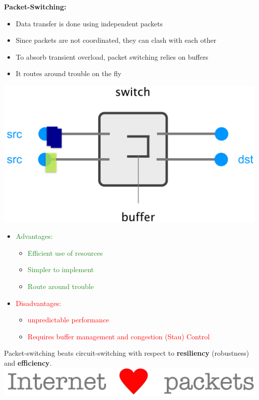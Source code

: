 \documentclass[a4paper, fontsize=8pt, landscape, DIV=1]{scrartcl}
\begin{document}
\begin{multicols*}{4}
				\textbf{Packet-Switching:}
				\vspace{-0.2cm}
				\begin{itemize}[noitemsep]
					\item Data transfer is done using independent packets 
					\item Since packets are not coordinated, they can clash with each other \
					\item To absorb transient overload, packet switching relies on buffers 
					\item It routes around trouble on the fly
				\end{itemize}
				\includegraphics[width=\columnwidth]{images/Overview/packet_switching_buffer.png}
				\begin{itemize}[noitemsep]
					\item \textcolor{ForestGreen}{Advantages:}
					\begin{itemize}
						\item \textcolor{ForestGreen}{Efficient use of resources} 
						\item \textcolor{ForestGreen}{Simpler to implement}
						\item \textcolor{ForestGreen}{Route around trouble}
					\end{itemize}
					\item \textcolor{red}{Disadvantages:}
					\begin{itemize}
						\item \textcolor{red}{unpredictable performance}
						\item \textcolor{red}{Requires buffer management and congestion (Stau) Control}
					\end{itemize} 
				\end{itemize}
				Packet-switching beats circuit-switching with respect to \textbf{resiliency} (robustness) and \textbf{efficiency}. 
				\includegraphics[width=\columnwidth]{images/Overview/internet_loves_packets.png}
			\newpage
			

\end{multicols*}
\end{document}
